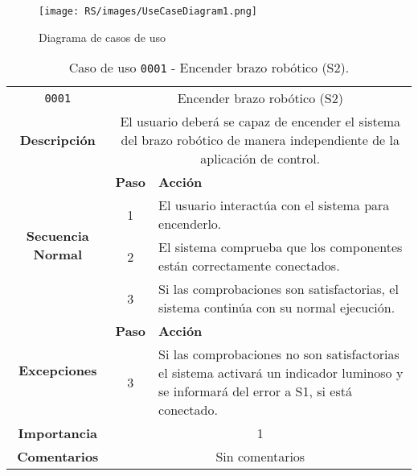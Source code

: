 

\begin{figure}[H]
    \centering
    \texttt{[image: RS/images/UseCaseDiagram1.png]}
    \caption{Diagrama de casos de uso}
    \label{fig:diagrama_casos_uso}
\end{figure}


\begin{table}[H]
    \centering
    \begin{tabularx}{\textwidth}{|c|c|X|}
        \cline{1-3}
        \texttt{0001}                              & \multicolumn{2}{c|}{Encender brazo robótico (\ac{S2})}                                                                                                                      \\ \cline{1-3}
        \textbf{Descripción}                       & \multicolumn{2}{m{13cm}|}{El usuario deberá se capaz de encender el sistema del brazo robótico de manera independiente de la aplicación de control.}
        \\ \cline{1-3}
        \multirow{4}{*}{\textbf{Secuencia Normal}} & \textbf{Paso} & \textbf{Acción}
        \\ \cline{2-3}                    &   1  & El usuario interactúa con el sistema para encenderlo.
        \\ \cline{2-3}                    &   2  & El sistema comprueba que los componentes están correctamente conectados.
        \\ \cline{2-3}                    &   3  & Si las comprobaciones son satisfactorias, el sistema continúa con su normal ejecución.
        \\ \cline{1-3}
        \multirow{2}{*}{\textbf{Excepciones}}      & \textbf{Paso}                                                                                                                                        & \textbf{Acción}
        \\ \cline{2-3}                    &   3  & Si las comprobaciones no son satisfactorias el sistema activará un indicador luminoso y se informará del error a \ac{S1}, si está conectado.
        \\ \cline{1-3}
        \textbf{Importancia}                       & \multicolumn{2}{c|}{1}                                                                                                                                                 \\ \cline{1-3}
        \textbf{Comentarios}                       & \multicolumn{2}{c|}{Sin comentarios}                                                                                                                                   \\ \cline{1-3}
    \end{tabularx}
    \caption{Caso de uso \texttt{0001} - Encender brazo robótico (\ac{S2}).}
    \label{tab:CU0001}
    \label{tab:caso_de_uso_encender_brazo_robotico}
\end{table}

